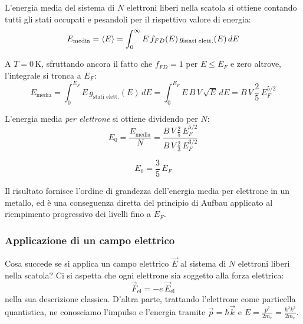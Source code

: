 L'energia media del sistema di \(N\) elettroni liberi nella scatola si ottiene contando tutti gli stati occupati e pesandoli per il rispettivo valore di energia:
\begin{equation}
    E_{\text{media}} = \expval{E} = \int_0^{\infty} E\, f_{FD}(E)\, g_{\text{stati elett.}}(E)\, dE
\end{equation}

A \(T = 0\,\text{K}\), sfruttando ancora il fatto che \(f_{FD} = 1\) per \(E \leq E_F\) e zero altrove, l'integrale si tronca a \(E_F\):
\begin{equation}
    E_{\text{media}} = \int_0^{E_F} E\, g_{\text{stati elett.}}(E)\, dE = \int_0^{E_F} E\, B\, V\, \sqrt{E}\, dE = B\, V\, \frac{2}{5}\, E_F^{5/2}
\end{equation}

L'energia media \emph{per elettrone} si ottiene dividendo per \(N\):
\begin{equation}
    E_0 = \frac{E_{\text{media}}}{N} = \frac{B\, V\, \frac{2}{5}\, E_F^{5/2}}{B\, V\, \frac{2}{3}\, E_F^{3/2}}
\end{equation}
\begin{importantbox}
    \begin{equation}
        E_0 = \frac{3}{5}\, E_F
    \end{equation}
\end{importantbox}
Il risultato fornisce l'ordine di grandezza dell'energia media per elettrone in un metallo, ed è una conseguenza diretta del principio di Aufbau applicato al riempimento progressivo dei livelli fino a \(E_F\).

\subsubsection{Applicazione di un campo elettrico}

Cosa succede se si applica un campo elettrico \(\vec{E}\) al sistema di \(N\) elettroni liberi nella scatola? Ci si aspetta che ogni elettrone sia soggetto alla forza elettrica:
\begin{equation}
    \vec{F}_{\text{el}} = -e\, \vec{E}_{\text{el}}
\end{equation}
nella sua descrizione classica. D'altra parte, trattando l'elettrone come particella quantistica, ne conosciamo l'impulso e l'energia tramite \(\vec{p} = \hbar \vec{k}\) e \(E = \frac{p^2}{2m_e} = \frac{\hbar^2 k^2}{2m_e}\).

